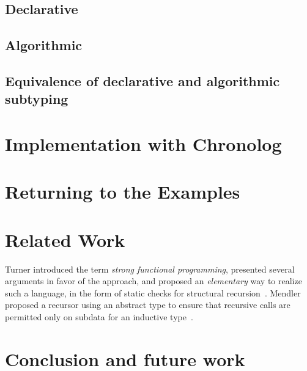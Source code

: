 \documentclass[runningheads]{llncs}
\begin{document}
  \subsection{Declarative}

  \subsection{Algorithmic}

  \subsection{Equivalence of declarative and algorithmic subtyping}

\section{Implementation with Chronolog} %

\section{Returning to the Examples} %


\section{Related Work} %

Turner introduced the term \emph{strong functional programming},
presented several arguments in favor of the approach, and proposed an
\emph{elementary} way to realize such a language, in the form of
static checks for structural recursion~\cite{turner95}.  Mendler
proposed a recursor using an abstract type to ensure that recursive
calls are permitted only on subdata for an inductive
type~\cite{mendler91}.

\section{Conclusion and future work} %




\end{document}
